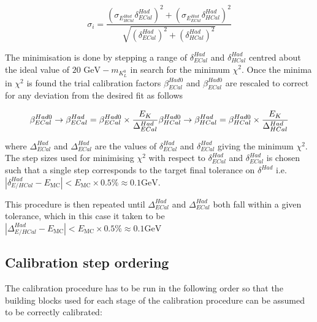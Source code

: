 \begin{equation}
\sigma_{i} = \frac{(\sigma_{E^{Had}_{HCal}}  \delta^{Had}_{ECal})^{2} + (\sigma_{E^{Had}_{ECal}} \delta^{Had}_{HCal})^{2}}{\sqrt{(\delta^{Had}_{ECal})^{2} + (\delta^{Had}_{HCal})^{2}}}
\label{equ:sigmaxicalc}
\end{equation}

The minimisation is done by stepping a range of $\delta^{Had}_{ECal}$ and $\delta^{Had}_{HCal}$ centred about the ideal value of $20 \text { GeV} - m_{K^{0}_{L}}$ in search for the minimum $\chi^{2}$.  Once the minima in $\chi^{2}$ is found the trial calibration factors $\beta^{Had0}_{ECal}$ and $\beta^{Had0}_{ECal}$ are rescaled to correct for any deviation from the desired fit as follows

\begin{equation}
\beta^{Had0}_{ECal} \rightarrow \beta^{Had}_{ECal} = \beta^{Had0}_{ECal} \times \frac{E_{K}}{\Delta^{Had}_{ECal}} \\
\beta^{Had0}_{HCal} \rightarrow \beta^{Had}_{HCal} = \beta^{Had0}_{HCal} \times \frac{E_{K}}{\Delta^{Had}_{HCal}}
\end{equation}

where $\Delta^{Had}_{ECal}$ and $\Delta^{Had}_{ECal}$ are the values of $\delta^{Had}_{ECal}$ and $\delta^{Had}_{ECal}$ giving the minimum $\chi^{2}$.  The step sizes used for minimising $\chi^{2}$ with respect to $\delta^{Had}_{ECal}$ and $\delta^{Had}_{ECal}$ is chosen such that a single step corresponds to the target final tolerance on $\delta^{Had}$ i.e. $|\delta^{Had}_{E/HCal} - E_{\text{MC}}| < E_{\text{MC}} \times 0.5 \% \approx 0.1 \text{GeV}$.  

This procedure is then repeated until $\Delta^{Had}_{ECal}$ and $\Delta^{Had}_{ECal}$ both fall within a given tolerance, which in this case it taken to be $|\Delta^{Had}_{E/HCal} - E_{\text{MC}}| < E_{\text{MC}} \times 0.5 \% \approx 0.1 \text{GeV}$


\subsection{Calibration step ordering}
\label{sec:orderingcalib}

The calibration procedure has to be run in the following order so that the building blocks used for each stage of the calibration procedure can be assumed to be correctly calibrated:

